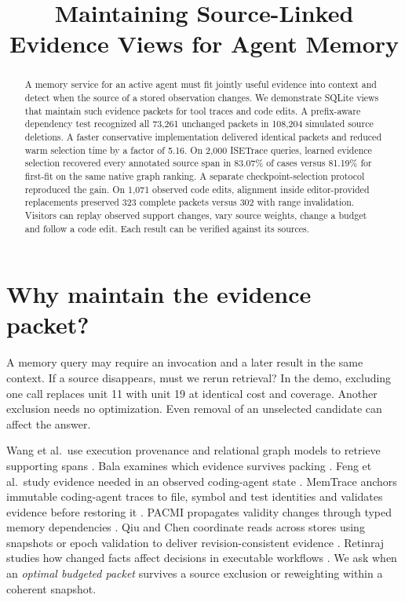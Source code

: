 \documentclass[conference]{IEEEtran}
\title{Maintaining Source-Linked Evidence Views for Agent Memory}
\author{}
\begin{document}
\maketitle
\begin{abstract}
A memory service for an active agent must fit jointly useful evidence into context and detect when the source of a stored observation changes. We demonstrate SQLite views that maintain such evidence packets for tool traces and code edits. A prefix-aware dependency test recognized all 73,261 unchanged packets in 108,204 simulated source deletions. A faster conservative implementation delivered identical packets and reduced warm selection time by a factor of 5.16. On 2,000 ISETrace queries, learned evidence selection recovered every annotated source span in 83.07\% of cases versus 81.19\% for first-fit on the same native graph ranking. A separate checkpoint-selection protocol reproduced the gain. On 1,071 observed code edits, alignment inside editor-provided replacements preserved 323 complete packets versus 302 with range invalidation. Visitors can replay observed support changes, vary source weights, change a budget and follow a code edit. Each result can be verified against its sources.

\end{abstract}

\section{Why maintain the evidence packet?}

A memory query may require an invocation and a later result in the same context. If a source disappears, must we rerun retrieval? In the demo, excluding one call replaces unit 11 with unit 19 at identical cost and coverage. Another exclusion needs no optimization. Even removal of an unselected candidate can affect the answer.

Wang et al.\ use execution provenance and relational graph models to retrieve supporting spans \cite{wang}. Bala examines which evidence survives packing \cite{bala}. Feng et al.\ study evidence needed in an observed coding-agent state \cite{feng}. MemTrace anchors immutable coding-agent traces to file, symbol and test identities and validates evidence before restoring it \cite{memtrace}. PACMI propagates validity changes through typed memory dependencies \cite{pacmi}. Qiu and Chen coordinate reads across stores using snapshots or epoch validation to deliver revision-consistent evidence \cite{readboundaries}. Retinraj studies how changed facts affect decisions in executable workflows \cite{changes}. We ask when an \emph{optimal budgeted packet} survives a source exclusion or reweighting within a coherent snapshot.
\end{document}
